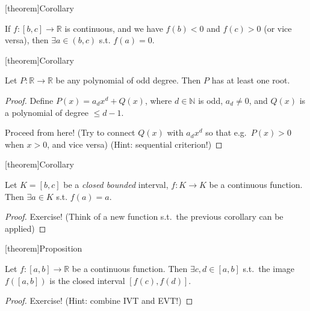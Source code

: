 \documentclass[12pt]{report}
\theoremstyle{definition}
\begin{document}
[theorem]{Corollary}
\begin{coro of IVT}
    If $f:[b,c]\rightarrow{}\mathbb{R}$ is continuous,
    and we have $f(b) < 0$ and $f(c) > 0$ (or vice versa),
    then $\exists a \in (b,c)$ s.t. $f(a) = 0$.
\end{coro of IVT}

[theorem]{Corollary}
\begin{odd degree polynomial has at least one root}
    Let $P:\mathbb{R}\rightarrow{}\mathbb{R}$ be any polynomial of odd degree.
    Then $P$ has at least one root.
\end{odd degree polynomial has at least one root}

\begin{proof}
    Define $P(x) = a_d x^{d} + Q(x)$, where $d \in \mathbb{N}$ is odd, $a_d\neq 0$,
    and $Q(x)$ is a polynomial of degree $\le d - 1$. 

    Proceed from here!
    (Try to connect $Q(x)$ with $a_d x^{d}$ so that e.g.\ $P(x) > 0$ when $x > 0$, and vice versa)
    (Hint: sequential criterion!)
\end{proof}

[theorem]{Corollary}
\begin{closed bounded continuous function has a fixed point}
    Let $K = [b,c]$ be a \emph{closed bounded} interval,
    $f:K\rightarrow{}K$ be a continuous function.
    Then $\exists a \in K$ s.t. $f(a) = a$.
\end{closed bounded continuous function has a fixed point}

\begin{proof}
    Exercise! (Think of a new function s.t.\ the previous corollary can be applied)
\end{proof}

[theorem]{Proposition}
\begin{image of bounded continuous function}
    Let $f:[a,b] \rightarrow \mathbb{R}$ be a continuous function.
    Then $\exists c,d\in[a,b]$ s.t.\ the image $f([a,b])$ is the closed
    interval $[f(c), f(d)]$.
\end{image of bounded continuous function}

\begin{proof}
    Exercise! (Hint: combine IVT and EVT!)
\end{proof} 
\end{document}
